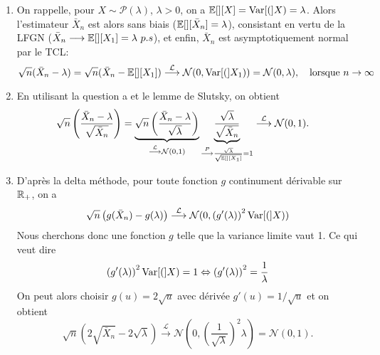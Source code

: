 \begin{solution}
  \begin{enumerate}
    \item On rappelle, pour $X\sim\mathcal P(\lambda)$, $\lambda>0$, on a
          $\mathbb{E}[][X]=\operatorname{Var}[(]X)=\lambda$. Alors l'estimateur $\bar X_n$ est alors sans
          biais ($\mathbb{E}[][\bar X_n] =\lambda$), consistant en vertu de la LFGN
          ($\bar X_n\longrightarrow \mathbb{E}[][X_1]=\lambda~p.s$), et enfin,
          $\bar{X}_n$ est asymptotiquement normal par le TCL:
          \[
            \sqrt n( \bar{X}
            _n-\lambda)=\sqrt n( \bar X_n-\mathbb{E}[][X_1])\stackrel{\mathcal
              L}\longrightarrow\mathcal N(0,\operatorname{Var}[(]X_1))=\mathcal
            N(0,\lambda),\quad\text{lorsque }n\to\infty
          \]

    \item En utilisant la question a et le lemme de Slutsky, on obtient
          \begin{align*}
            \sqrt n \left(\frac{\bar X_n-\lambda}{\sqrt{\bar X_n}} \right)
             & = \underbrace{ \sqrt n \left(\frac{\bar X_n-\lambda}{\sqrt{\lambda}} \right) }_{\stackrel{\mathcal L}\longrightarrow\mathcal N(0,1)} \underbrace{\frac{\sqrt{\lambda}}{\sqrt{\bar X_n}}}_{\stackrel{P}\longrightarrow \frac{\sqrt{\lambda}}{\sqrt{\mathbb{E}[][X_1]}}=1}
            \stackrel{\mathcal L}\longrightarrow\mathcal N(0,1).
          \end{align*}
    \item D'apr\`es la delta m\'ethode, pour toute fonction $g$ continument d\'erivable
          sur $\mathbb{R}_+$, on a
          \[
            \sqrt n \left(g(\bar X_n)-g(\lambda)
            \right)\stackrel{\mathcal L}\longrightarrow\mathcal
            N(0,{(g'(\lambda))}^2\operatorname{Var}[(]X))
          \]
          Nous cherchons donc une fonction $g$ telle que
          la variance limite vaut 1. Ce qui veut dire
          \[
            {(g'(\lambda))}^2\operatorname{Var}[(]X)=1
            \Leftrightarrow {(g'(\lambda))}^2 = \frac1\lambda
          \]
          On peut alors choisir $g(u)
            = 2\sqrt u$ avec d\'eriv\'ee $g'(u)= 1/\sqrt u$ et on obtient
          \[
            \sqrt n
            \left(2\sqrt{\bar X_n}-2\sqrt \lambda \right)\stackrel{\mathcal
              L}\longrightarrow\mathcal
            N\left(0,{\left(\frac1{\sqrt\lambda}\right)}^2\lambda\right)=\mathcal N(0,1).
          \]

  \end{enumerate}

\end{solution}

